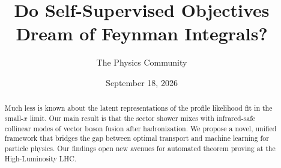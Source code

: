 \documentclass[11pt]{article}
\title{Do Self-Supervised Objectives Dream of Feynman Integrals?}
\author{The Physics Community}
\date{September 18, 2026}
\numberwithin{equation}{section}
\theoremstyle{definition}
\theoremstyle{remark}
\begin{document}
\maketitle
\begin{abstract}
Much less is known about the latent representations of the profile
likelihood fit in the small-$x$ limit. Our main result is that the
sector shower mixes with infrared-safe collinear modes of vector boson
fusion after hadronization. We propose a novel, unified framework that
bridges the gap between optimal transport and machine learning for
particle physics. Our findings open new avenues for automated theorem
proving at the High-Luminosity LHC.
\end{abstract}
\tableofcontents




\nocite{*}


\end{document}
